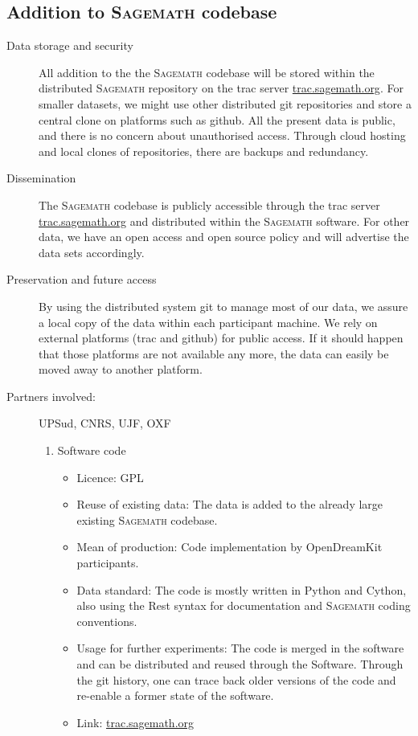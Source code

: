 \documentclass[12pt]{article}
\newcommand{\software}[1]{\textsc{#1}\xspace}
\newcommand{\Sage}{\software{Sagemath}}
\begin{document}
\subsection{Addition to \Sage codebase}

\begin{description}
\item[Data storage and security] All addition to the the \Sage codebase will be stored within the distributed \Sage repository on the trac server \href{http://trac.sagemath.org/}{trac.sagemath.org}. For smaller datasets, we might use other distributed git repositories and store a central clone on platforms such as github. All the present data is public, and there is no concern about
unauthorised access. Through cloud hosting and local clones of
repositories, there are backups and redundancy.
\label{Sagesec}
\item[Dissemination] The \Sage codebase is publicly accessible through the trac server \href{http://trac.sagemath.org/}{trac.sagemath.org} and distributed within the \Sage software. For other data, we have an open access and open source policy and will advertise the data sets accordingly.
\label{Sagediss}
\item[Preservation and future access] By using the distributed system git to manage most of our data, we assure a local copy of the data within each participant machine. We rely on external platforms (trac and github) for public access. If it should happen that those platforms are not available any more, the data can easily be moved away to another platform.
\item[Partners involved:] UPSud, CNRS, UJF, OXF
\label{Sagepres}


\begin{enumerate}
\item{Software code}
\begin{itemize}
\item{Licence:} GPL
\item{Reuse of existing data:} The data is added to the already large existing \Sage codebase.
\item{Mean of production:} Code implementation by OpenDreamKit participants.
\item{Data standard:} The code is mostly written in Python and Cython, also using the Rest syntax for documentation and \Sage coding conventions.
\item{Usage for further experiments:} The code is merged in the software and can be distributed and reused through the Software. Through the git history,
one can trace back older versions of the code and re-enable a former state of the software.
\item{Link:} \href{http://trac.sagemath.org/}{trac.sagemath.org}


\end{itemize}
\end{enumerate}
\end{description}
\end{document}
